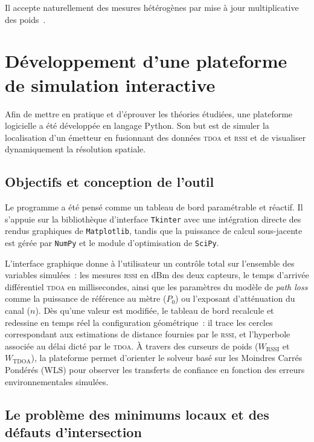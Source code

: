 \documentclass[12pt, a4paper]{article}
\newcommand{\TDOA}{\textsc{tdoa}}
\newcommand{\RSSI}{\textsc{rssi}}
\begin{document}
Il accepte naturellement des mesures hétérogènes par mise à jour multiplicative
des poids~\cite{Klingbeil2008}.

\section{Développement d'une plateforme de simulation interactive}

Afin de mettre en pratique et d'éprouver les théories étudiées, une plateforme logicielle a été développée en langage Python. Son but est de simuler la localisation d'un émetteur en fusionnant des données \TDOA{} et \RSSI{} et de visualiser dynamiquement la résolution spatiale.

\subsection{Objectifs et conception de l'outil}

Le programme a été pensé comme un tableau de bord paramétrable et réactif. Il s'appuie sur la bibliothèque d'interface \texttt{Tkinter} avec une intégration directe des rendus graphiques de \texttt{Matplotlib}, tandis que la puissance de calcul sous-jacente est gérée par \texttt{NumPy} et le module d'optimisation de \texttt{SciPy}. 

L'interface graphique donne à l'utilisateur un contrôle total sur l'ensemble des variables simulées~: les mesures \RSSI{} en dBm des deux capteurs, le temps d'arrivée différentiel \TDOA{} en millisecondes, ainsi que les paramètres du modèle de \textit{path loss} comme la puissance de référence au mètre ($P_0$) ou l'exposant d'atténuation du canal ($n$). Dès qu'une valeur est modifiée, le tableau de bord recalcule et redessine en temps réel la configuration géométrique~: il trace les cercles correspondant aux estimations de distance fournies par le \RSSI{}, et l'hyperbole associée au délai dicté par le \TDOA{}. \`A travers des curseurs de poids ($W_{\text{RSSI}}$ et $W_{\text{TDOA}}$), la plateforme permet d'orienter le solveur basé sur les Moindres Carrés Pondérés (WLS) pour observer les transferts de confiance en fonction des erreurs environnementales simulées.

\subsection{Le problème des minimums locaux et des défauts d'intersection}
\end{document}
